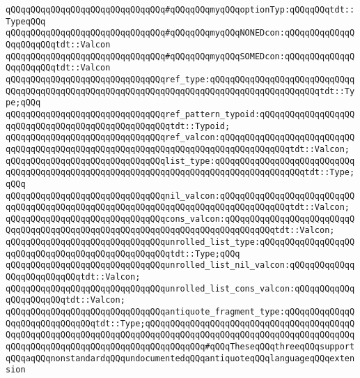 \verb|qQQqqQQqqQQqqQQqqQQqqQQqqQQqqQQq#qQQqqQQqmyqQQqoptionTyp:qQQqqQQqtdt::TypeqQQq|\newline
\verb|qQQqqQQqqQQqqQQqqQQqqQQqqQQqqQQq#qQQqqQQqmyqQQqNONEDcon:qQQqqQQqqQQqqQQqqQQqqQQqtdt::Valcon|\newline
\verb|qQQqqQQqqQQqqQQqqQQqqQQqqQQqqQQq#qQQqqQQqmyqQQqSOMEDcon:qQQqqQQqqQQqqQQqqQQqqQQqtdt::Valcon|\newline
\newline
\newline
\verb|qQQqqQQqqQQqqQQqqQQqqQQqqQQqqQQqref_type:qQQqqQQqqQQqqQQqqQQqqQQqqQQqqQQqqQQqqQQqqQQqqQQqqQQqqQQqqQQqqQQqqQQqqQQqqQQqqQQqqQQqqQQqqQQqtdt::Type;qQQq|\newline
\verb|qQQqqQQqqQQqqQQqqQQqqQQqqQQqqQQqref_pattern_typoid:qQQqqQQqqQQqqQQqqQQqqQQqqQQqqQQqqQQqqQQqqQQqqQQqqQQqtdt::Typoid;|\newline
\verb|qQQqqQQqqQQqqQQqqQQqqQQqqQQqqQQqref_valcon:qQQqqQQqqQQqqQQqqQQqqQQqqQQqqQQqqQQqqQQqqQQqqQQqqQQqqQQqqQQqqQQqqQQqqQQqqQQqqQQqqQQqtdt::Valcon;|\newline
\newline
\verb|qQQqqQQqqQQqqQQqqQQqqQQqqQQqqQQqlist_type:qQQqqQQqqQQqqQQqqQQqqQQqqQQqqQQqqQQqqQQqqQQqqQQqqQQqqQQqqQQqqQQqqQQqqQQqqQQqqQQqqQQqqQQqtdt::Type;qQQq|\newline
\verb|qQQqqQQqqQQqqQQqqQQqqQQqqQQqqQQqnil_valcon:qQQqqQQqqQQqqQQqqQQqqQQqqQQqqQQqqQQqqQQqqQQqqQQqqQQqqQQqqQQqqQQqqQQqqQQqqQQqqQQqqQQqtdt::Valcon;|\newline
\verb|qQQqqQQqqQQqqQQqqQQqqQQqqQQqqQQqcons_valcon:qQQqqQQqqQQqqQQqqQQqqQQqqQQqqQQqqQQqqQQqqQQqqQQqqQQqqQQqqQQqqQQqqQQqqQQqqQQqqQQqtdt::Valcon;|\newline
\newline
\verb|qQQqqQQqqQQqqQQqqQQqqQQqqQQqqQQqunrolled_list_type:qQQqqQQqqQQqqQQqqQQqqQQqqQQqqQQqqQQqqQQqqQQqqQQqqQQqtdt::Type;qQQq|\newline
\verb|qQQqqQQqqQQqqQQqqQQqqQQqqQQqqQQqunrolled_list_nil_valcon:qQQqqQQqqQQqqQQqqQQqqQQqqQQqtdt::Valcon;|\newline
\verb|qQQqqQQqqQQqqQQqqQQqqQQqqQQqqQQqunrolled_list_cons_valcon:qQQqqQQqqQQqqQQqqQQqqQQqtdt::Valcon;|\newline
\newline
\verb|qQQqqQQqqQQqqQQqqQQqqQQqqQQqqQQqantiquote_fragment_type:qQQqqQQqqQQqqQQqqQQqqQQqqQQqqQQqtdt::Type;qQQqqQQqqQQqqQQqqQQqqQQqqQQqqQQqqQQqqQQqqQQqqQQqqQQqqQQqqQQqqQQqqQQqqQQqqQQqqQQqqQQqqQQqqQQqqQQqqQQqqQQqqQQqqQQqqQQqqQQqqQQqqQQqqQQqqQQqqQQqqQQqqQQqqQQq#qQQqTheseqQQqthreeqQQqsupportqQQqaqQQqnonstandardqQQqundocumentedqQQqantiquoteqQQqlanguageqQQqextension|\newline
